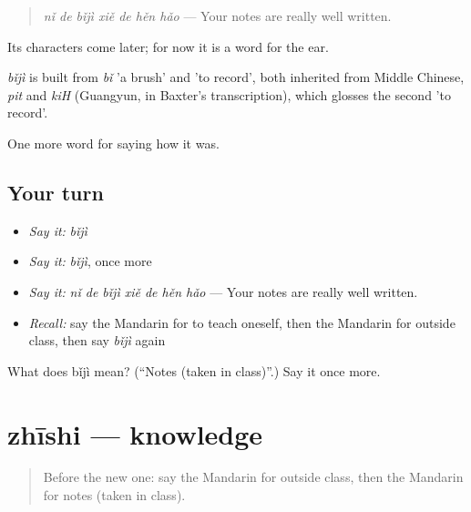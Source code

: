 \begin{quote}
\emph{nǐ de bǐjì xiě de hěn hǎo} — Your notes are really well written.
\end{quote}

Its characters come later; for now it is a word for the ear.

\begin{cousinweb}
\emph{bǐjì} is built from \emph{bǐ} 'a brush' and  'to record', both inherited from Middle Chinese, \emph{pit} and \emph{kiH} (Guangyun, in Baxter's transcription), which glosses the second 'to record'.
\end{cousinweb}

\begin{grammarlens}[title={What you've built}]
One more word for saying how it was.
\end{grammarlens}

\subsection*{Your turn}
\begin{itemize}
\raggedright
  \item \emph{Say it:} \emph{bǐjì}
  \item \emph{Say it:} \emph{bǐjì}, once more
  \item \emph{Say it:} \emph{nǐ de bǐjì xiě de hěn hǎo} — Your notes are really well written.
  \item \emph{Recall:} say the Mandarin for to teach oneself, then the Mandarin for outside class, then say \emph{bǐjì} again
\end{itemize}

\begin{tcolorbox}[breakable,colback=teal!4,colframe=teal!35!black,title={Before you move on}]
What does bǐjì mean? (\textquotedblleft{}Notes (taken in class)\textquotedblright{}.) Say it once more.
\end{tcolorbox}
\section[zhīshi]{zhīshi — knowledge}

\label{lesson:ZH-C497-zhishi}



\begin{quote}
Before the new one: say the Mandarin for outside class, then the Mandarin for notes (taken in class).
\end{quote}

